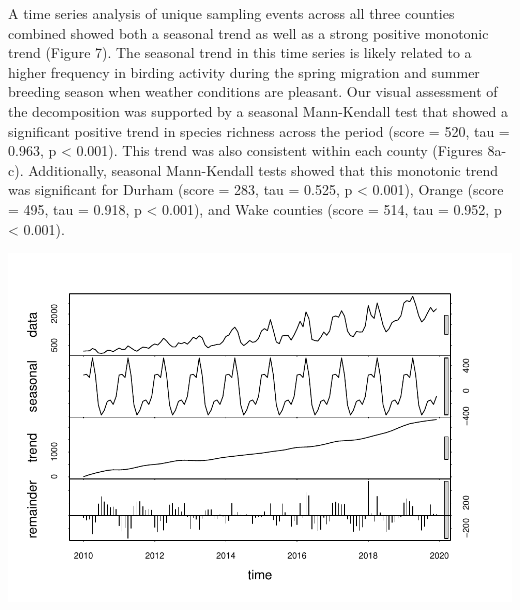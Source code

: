 \documentclass[
  12pt,
]{article}
\newenvironment{Shaded}{\begin{snugshade}}{\end{snugshade}}
\newcommand{\AttributeTok}[1]{\textcolor[rgb]{0.77,0.63,0.00}{#1}}
\newcommand{\CommentTok}[1]{\textcolor[rgb]{0.56,0.35,0.01}{\textit{#1}}}
\newcommand{\DecValTok}[1]{\textcolor[rgb]{0.00,0.00,0.81}{#1}}
\newcommand{\FunctionTok}[1]{\textcolor[rgb]{0.00,0.00,0.00}{#1}}
\newcommand{\NormalTok}[1]{#1}
\newcommand{\OtherTok}[1]{\textcolor[rgb]{0.56,0.35,0.01}{#1}}
\newcommand{\SpecialCharTok}[1]{\textcolor[rgb]{0.00,0.00,0.00}{#1}}
\newcommand{\StringTok}[1]{\textcolor[rgb]{0.31,0.60,0.02}{#1}}
\begin{document}
A time series analysis of unique sampling events across all three
counties combined showed both a seasonal trend as well as a strong
positive monotonic trend (Figure 7). The seasonal trend in this time
series is likely related to a higher frequency in birding activity
during the spring migration and summer breeding season when weather
conditions are pleasant. Our visual assessment of the decomposition was
supported by a seasonal Mann-Kendall test that showed a significant
positive trend in species richness across the period (score = 520, tau =
0.963, p \textless{} 0.001). This trend was also consistent within each
county (Figures 8a-c). Additionally, seasonal Mann-Kendall tests showed
that this monotonic trend was significant for Durham (score = 283, tau =
0.525, p \textless{} 0.001), Orange (score = 495, tau = 0.918, p
\textless{} 0.001), and Wake counties (score = 514, tau = 0.952, p
\textless{} 0.001).

\begin{Shaded}
\end{Shaded}

\includegraphics{Project_Template_files/figure-latex/Event TS Code-1.pdf}
\end{document}
